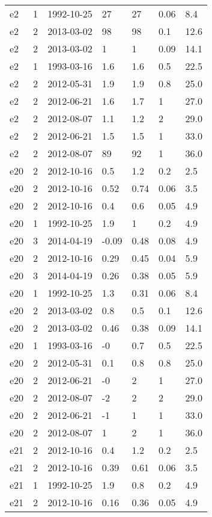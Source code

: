 \begin{table*}[htp]
\begin{tabular}{llll}
e2 & 1 & 1992-10-25 & 27 & 27 & 0.06 & 8.4 \\
e2 & 2 & 2013-03-02 & 98 & 98 & 0.1 & 12.6 \\
e2 & 2 & 2013-03-02 & 1 & 1 & 0.09 & 14.1 \\
e2 & 1 & 1993-03-16 & 1.6 & 1.6 & 0.5 & 22.5 \\
e2 & 2 & 2012-05-31 & 1.9 & 1.9 & 0.8 & 25.0 \\
e2 & 2 & 2012-06-21 & 1.6 & 1.7 & 1 & 27.0 \\
e2 & 2 & 2012-08-07 & 1.1 & 1.2 & 2 & 29.0 \\
e2 & 2 & 2012-06-21 & 1.5 & 1.5 & 1 & 33.0 \\
e2 & 2 & 2012-08-07 & 89 & 92 & 1 & 36.0 \\
e20 & 2 & 2012-10-16 & 0.5 & 1.2 & 0.2 & 2.5 \\
e20 & 2 & 2012-10-16 & 0.52 & 0.74 & 0.06 & 3.5 \\
e20 & 2 & 2012-10-16 & 0.4 & 0.6 & 0.05 & 4.9 \\
e20 & 1 & 1992-10-25 & 1.9 & 1 & 0.2 & 4.9 \\
e20 & 3 & 2014-04-19 & -0.09 & 0.48 & 0.08 & 4.9 \\
e20 & 2 & 2012-10-16 & 0.29 & 0.45 & 0.04 & 5.9 \\
e20 & 3 & 2014-04-19 & 0.26 & 0.38 & 0.05 & 5.9 \\
e20 & 1 & 1992-10-25 & 1.3 & 0.31 & 0.06 & 8.4 \\
e20 & 2 & 2013-03-02 & 0.8 & 0.5 & 0.1 & 12.6 \\
e20 & 2 & 2013-03-02 & 0.46 & 0.38 & 0.09 & 14.1 \\
e20 & 1 & 1993-03-16 & -0 & 0.7 & 0.5 & 22.5 \\
e20 & 2 & 2012-05-31 & 0.1 & 0.8 & 0.8 & 25.0 \\
e20 & 2 & 2012-06-21 & -0 & 2 & 1 & 27.0 \\
e20 & 2 & 2012-08-07 & -2 & 2 & 2 & 29.0 \\
e20 & 2 & 2012-06-21 & -1 & 1 & 1 & 33.0 \\
e20 & 2 & 2012-08-07 & 1 & 2 & 1 & 36.0 \\
e21 & 2 & 2012-10-16 & 0.4 & 1.2 & 0.2 & 2.5 \\
e21 & 2 & 2012-10-16 & 0.39 & 0.61 & 0.06 & 3.5 \\
e21 & 1 & 1992-10-25 & 1.9 & 0.8 & 0.2 & 4.9 \\
e21 & 2 & 2012-10-16 & 0.16 & 0.36 & 0.05 & 4.9 \\

\end{tabular}
\end{table*}
